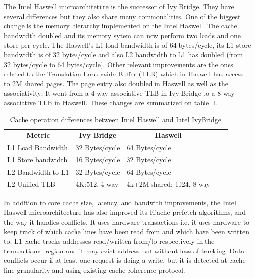 The Intel Haswell microarchiteture is the successor of Ivy Bridge. They have several differences but they also share many commonalities. One of the biggest change is the memory hierarchy implemented on the Intel Haswell. The cache bandwidth doubled and its memory sytem can now perform two loads and one store per cycle. The Haswell's L1 load bandwidth is of 64 bytes/cycle, its L1 store bandwidth is of 32 bytes/cycle and also L2 bandwidth to L1 has doubled (from 32 bytes/cycle to 64 bytes/cycle). Other relevant improvements are the ones related to the Translation Look-aside Buffer (TLB) which in Haswell has access to 2M shared pages. The page entry also doubled in Haswell as well as the associativity; It went from a 4-way associative TLB in Ivy Bridge to a 8-way associative TLB in Haswell. These changes are summarized on table~\ref{tab:haswell_ivy}.

\begin{table}[ht]
\footnotesize
\begin{tabular}{|l|l|l|ll}
\cline{1-3}
\multicolumn{1}{|c|}{\textbf{Metric}} & \multicolumn{1}{c|}{\textbf{Ivy Bridge}} & \multicolumn{1}{c|}{\textbf{Haswell}} &  &  \\ \cline{1-3}
L1 Load Bandwidth                     & 32 Bytes/cycle                           & 64 Bytes/cycle                        &  &  \\ \cline{1-3}
L1 Store bandwidth                    & 16 Bytes/cycle                           & 32 Bytes/cycle                        &  &  \\ \cline{1-3}
L2 Bandwidth to L1                    & 32 Bytes/cycle                           & 64 Bytes/cycle                        &  &  \\ \cline{1-3}
L2 Unified TLB                        & 4K:512, 4-way                            & 4k+2M shared: 1024, 8-way             &  &  \\ \cline{1-3}
\end{tabular}
\caption{Cache operation differences between Intel Haswell and Intel IvyBridge}
\label{tab:haswell_ivy}
\end{table}

In addition to core cache size, latency, and bandwith improvements, the Intel Haswell microarchitecture has also improved its ICache prefetch algorithms, and the way it handles conflicts. It uses hardware transactions i.e. it uses hardware to keep track of which cache lines have been read from and which have been written to. L1 cache tracks addresses read/written from/to respectively in the transactional region and it may evict address but without loss of tracking. Data conflicts occur if at least one request is doing a write, but it is detected at cache line granularity and using existing cache coherence protocol.

